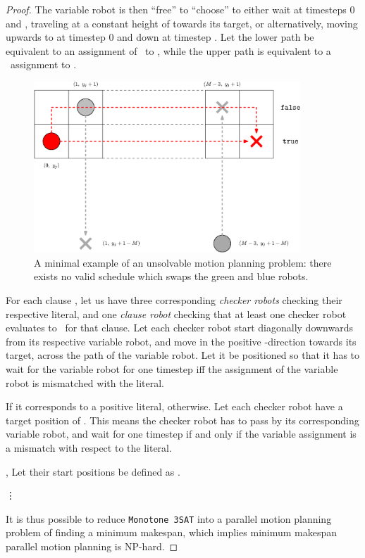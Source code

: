 \begin{proof}
	The variable robot is then \enquote{free} to \enquote{choose} to either wait at timesteps 0 and , traveling at a constant height of  towards its target, or alternatively, moving upwards to  at timestep 0 and down at timestep . Let the lower path be equivalent to an assignment of \true\  to , while the upper path is equivalent to a \false\ assignment to .

	
\begin{figure}[h]
	\centering
	\includegraphics[width=10cm]{ipe/variable_and_first_aux.eps}
	\caption{A minimal example of an unsolvable motion planning problem: there exists no valid schedule which swaps the green and blue robots.}\label{fig:reachability}
\end{figure}

	For each clause , let us have three corresponding \emph{checker robots}  checking their respective literal, and one \emph{clause robot} checking that at least one checker robot evaluates to \true\ for that clause. Let each checker robot start diagonally downwards from its respective variable robot, and move in the positive -direction towards its target, across the path of the variable robot. Let it be positioned so that it has to wait for the variable robot for one timestep iff the assignment of the variable robot is mismatched with the literal. 




	If it corresponds to a positive literal,  otherwise. Let each checker robot have a target position of . This means the checker robot has to pass by its corresponding variable robot, and wait for one timestep if and only if the variable assignment is a mismatch with respect to the literal. 

	,  Let their start positions be defined as .



	\vdots 

	It is thus possible to reduce \texttt{Monotone 3SAT} into a parallel motion planning problem of finding a minimum makespan, which implies minimum makespan parallel motion planning is NP-hard.
 
\end{proof}

